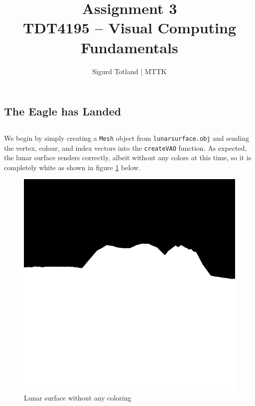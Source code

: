 \documentclass[]{article}
\title{\Huge{Assignment 3} \\ \Large{TDT4195 – Visual Computing Fundamentals}}
\author{Sigurd Totland | MTTK}
\begin{document}
\maketitle
\begin{multicols}{2}
\section{The Eagle has Landed}
\subsection{}
We begin by simply creating a \texttt{Mesh} object from \texttt{lunarsurface.obj} and sending the vertex, colour, and index vectors into the \texttt{createVAO} function. As expected, the lunar surface renders correctly, albeit without any colors at this time, so it is completely white as shown in figure \ref{fig:white-surface} below.
\begin{figure}[H]
\centering
\includegraphics[width=0.5\columnwidth]{white-surface}
\caption{Lunar surface without any coloring}
\label{fig:white-surface}
\end{figure}

\setcounter{subsection}{2}

\end{multicols}
\end{document}

